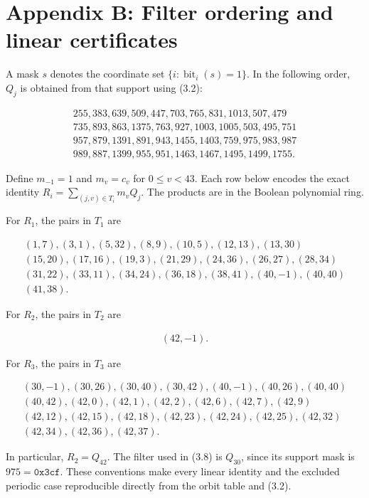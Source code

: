 \documentclass[pdflatex,sn-mathphys-num]{sn-jnl}
\begin{document}
\section*{Appendix B: Filter ordering and linear certificates}

A mask $s$ denotes the coordinate set $\{i: \operatorname{bit}_i(s)=1\}$. In the following order, $Q_j$ is obtained from that support using (3.2):

\[
\begin{gathered}
255,383,639,509,447,703,765,831,1013,507,479 \\
735,893,863,1375,763,927,1003,1005,503,495,751 \\
957,879,1391,891,943,1455,1403,759,975,983,987 \\
989,887,1399,955,951,1463,1467,1495,1499,1755.
\end{gathered}
\]

Define $m_{-1}=1$ and $m_v=c_v$ for $0\le v<43$. Each row below encodes the exact identity $R_i=\sum_{(j,v)\in T_i}m_vQ_j$. The products are in the Boolean polynomial ring.

For $R_1$, the pairs in $T_1$ are

\[
\begin{gathered}
(1,7),(3,1),(5,32),(8,9),(10,5),(12,13),(13,30) \\
(15,20),(17,16),(19,3),(21,29),(24,36),(26,27),(28,34) \\
(31,22),(33,11),(34,24),(36,18),(38,41),(40,-1),(40,40) \\
(41,38).
\end{gathered}
\]

For $R_2$, the pairs in $T_2$ are

\[
\begin{gathered}
(42,-1).
\end{gathered}
\]

For $R_3$, the pairs in $T_3$ are

\[
\begin{gathered}
(30,-1),(30,26),(30,40),(30,42),(40,-1),(40,26),(40,40) \\
(40,42),(42,0),(42,1),(42,2),(42,6),(42,7),(42,9) \\
(42,12),(42,15),(42,18),(42,23),(42,24),(42,25),(42,32) \\
(42,34),(42,36),(42,37).
\end{gathered}
\]

In particular, $R_2=Q_{42}$. The filter used in (3.8) is $Q_{30}$, since its support mask is $975=\mathtt{0x3cf}$. These conventions make every linear identity and the excluded periodic case reproducible directly from the orbit table and (3.2).
\end{document}
